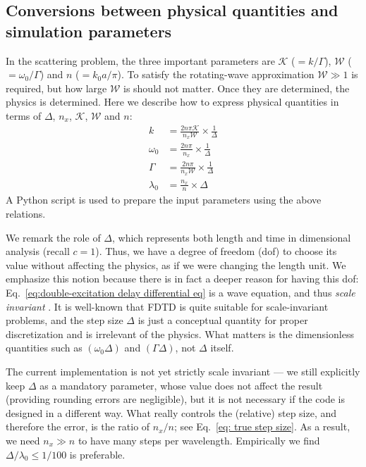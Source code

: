 \documentclass[12pt,letter,onecolumn,notitlepage]{article}
\begin{document}
\begin{appendices}
\section{Conversions between physical quantities and simulation parameters} 
\label{appen: translation}
In the scattering problem, the three important parameters are $\mathcal{K}$ ($=k/\Gamma$), $\mathcal{W}$ ($=\omega_0/\Gamma$) and $n$ ($=k_0a/\pi$). To satisfy the rotating-wave approximation $\mathcal{W}\gg1$ is required, but how large $\mathcal{W}$ is should not matter. Once they are determined, the physics is determined. Here we describe how to express physical quantities in terms of $\Delta$, $n_x$, $\mathcal{K}$, $\mathcal{W}$ and $n$:
\begin{align}
	k&=\frac{2n\pi\mathcal{K}}{n_x\mathcal{W}}\times\frac{1}{\Delta}\\
	\omega_0&=\frac{2n\pi}{n_x}\times\frac{1}{\Delta}\\
	\Gamma&=\frac{2n\pi}{n_x\mathcal{W}}\times\frac{1}{\Delta}\\
	\lambda_0&=\frac{n_x}{n}\times\Delta \label{eq: true step size}
\end{align}
A Python script is used to prepare the input parameters using the above relations. 

We remark the role of $\Delta$, which represents both length and time in dimensional analysis (recall $c=1$). Thus, we have a degree of freedom (dof) to choose its value without affecting the physics, as if we were changing the length unit. We emphasize this notion because 
there is in fact a deeper reason for having this dof: Eq.~\eqref{eq:double-excitation delay differential eq} is a wave equation, and thus \textit{scale invariant} \cite{PhotonicCrystalBook}. It is well-known that FDTD is quite suitable for scale-invariant problems, and the step size $\Delta$ is just a conceptual quantity for proper discretization and is irrelevant of the physics. 
What matters is the dimensionless quantities such as $(\omega_0\Delta)$ and $(\Gamma\Delta)$, not $\Delta$ itself. 

The current implementation is not yet strictly scale invariant --- we still explicitly keep $\Delta$ as a mandatory parameter, whose value does not affect the result (providing rounding errors are negligible), but it is not necessary if the code is designed in a different way. What really controls the (relative) step size, and therefore the error, is the ratio of $n_x/n$; see Eq.~\eqref{eq: true step size}. As a result, we need $n_x\gg n$ to have many steps per wavelength. Empirically we find $\Delta/\lambda_0\leq1/100$ is preferable.



\end{appendices}
\end{document}
